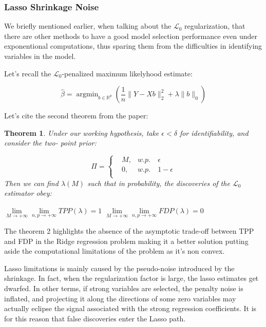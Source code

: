 \documentclass[10pt,onecolumn,letterpaper]{article}
\newtheorem{theorem}{Theorem}
\DeclareMathOperator*{\argmin}{argmin}
\begin{document}
\subsubsection{Lasso Shrinkage Noise}

We briefly mentioned earlier, when talking about the $\mathcal{L}_0$ regularization, that there are other methods to have a good model selection performance even under exponentional computations, thus sparing them from the difficulties in identifying variables in the model.
\newline 

Let's recall the $\mathcal{L}_0$-penalized maximum likelyhood estimate:

$$
\hat{\beta} = \argmin_{b \in \mathbb{R}^p} \left( \frac{1}{n}\lVert Y - Xb \rVert_2^2 + \lambda \lVert b \rVert_0 \right )
$$

Let's cite the second theorem from the paper:

\begin{theorem}
   Under our working hypothesis, take $\epsilon < \delta$ for identifiability, and consider the two- point prior:

   \begin{equation}
      \Pi = 
      \left\{
          \begin{aligned}
            &M,      &w.p. ~&\epsilon \\
            &0,      &w.p. ~& 1 - \epsilon \\
          \end{aligned}
        \right.
    \end{equation}
   Then we can find $\lambda(M)$ such that in probability, the discoveries of the $\mathcal{L}_0$ estimator obey:

   \begin{center}
      $\lim\limits_{M \rightarrow +\infty} \lim\limits_{n,p \rightarrow +\infty}  TPP(\lambda) = 1$
      $\lim\limits_{M \rightarrow +\infty} \lim\limits_{n,p \rightarrow +\infty}  FDP(\lambda) = 0$
      \end{center}


\end{theorem}

The theorem 2 highlights the absence of the asymptotic trade-off between TPP and FDP in the Ridge regression problem making it a better solution putting aside the computational limitations of the problem as it's non convex. 
\newline


Lasso limitations is mainly caused by the pseudo-noise introduced by the shrinkage. In fact, when the regularization factor is large, the lasso estimates get dwarfed. In other terms, if strong variables are selected, the penalty noise is inflated, and projecting it along the directions of some zero variables may actually eclipse the signal associated with the strong regression coefficients. It is for this reason that false discoveries enter the Lasso path.
\newline
\end{document}
